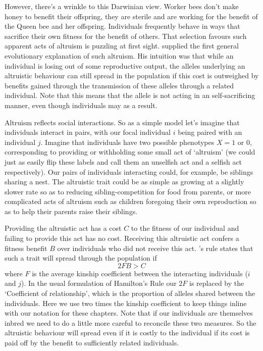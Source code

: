 However, there's a wrinkle to this Darwinian view. Worker bees don't make honey
to benefit their offspring, they are sterile and are working
for the benefit of the Queen bee and her offspring. 
Individuals frequently behave in ways that sacrifice their own fitness for the
benefit of others. That selection favours such apparent acts of altruism is puzzling at first sight. \citet{hamilton1964genetical,hamilton1964genetical2} supplied the first general evolutionary explanation of such altruism. 
His intuition was that while an individual is losing out of some reproductive output, the alleles underlying an altruistic behaviour can still spread in the population if this cost is outweighed by benefits gained 
through the transmission of these alleles through a related individual. Note that this means that the
allele is not acting in an self-sacrificing manner, even though individuals may as a result. 

Altruism reflects social interactions. So as a simple model let's imagine that individuals interact in pairs, with our focal
individual $i$ being paired with an individual $j$.  
Imagine that individuals have two possible phenotypes $X=1$ or $0$,
corresponding to providing or withholding some small act of `altruism'
(we could just as easily flip these labels and call them an unselfish
act and a selfish act respectively). 
Our pairs of individuals interacting could, for example, be siblings sharing a
nest. The altruistic trait could be as simple as growing at a slightly slower rate so as to reducing sibling-competition for food from
parents, or more complicated acts of altruism such as children foregoing their own reproduction so as to help their parents raise their siblings.

Providing the altruistic act has a cost $C$ to the fitness of our individual and failing to provide this act has no cost. Receiving this altruistic act confers a fitness benefit $B$ over individuals who did not receive this act. \citeauthor{hamilton1964genetical}'s rule states that such a trait will spread through the population if 
\begin{equation}
 2F B > C 
\end{equation}
where $F$ is the average kinship coefficient between the interacting
individuals ($i$ and $j$). In the usual formulation of Hamilton's Rule our $2F$ is replaced by the `Coefficient of relationship', which is the
  proportion of alleles shared between the individuals. Here we use
  two times the kinship coefficient to keep things inline with our 
  notation for these chapters. Note that if our individuals are themselves inbred we need
to do a little more careful to reconcile these two measures.
So the altruistic behaviour will spread even if it is costly to the individual if its cost is paid off by the benefit to sufficiently related individuals. 

